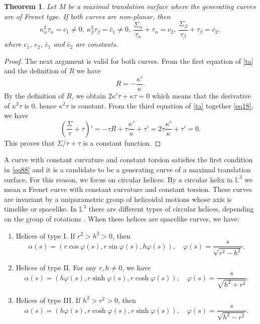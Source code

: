 \documentclass[a4paper,12pt]{amsart}
\numberwithin{equation}{section}
\newtheorem{theorem}{Theorem}[section]
\theoremstyle{definition}
\def\rr{\mathbb L}
\begin{document}
 \begin{theorem}\label{t41}
 Let $M$ be a maximal  translation surface where the generating curves are of Frenet type. If both curves are non-planar, then 
 \begin{equation}\label{eq88}
\kappa_\alpha^2\tau_\alpha=c_1\not=0,\ \kappa_\beta^2\tau_\beta=\bar{c}_1\not=0,\ \frac{\Sigma_\alpha}{\tau_\alpha}+\tau_\alpha=c_2,\ \frac{\Sigma_\beta}{\tau_\beta}+\tau_\beta=\bar{c}_2,
\end{equation}
 where $c_1$, $c_2$, $\bar{c}_1$ and $\bar{c}_2$ are constants.
 \end{theorem}

 \begin{proof}  The next argument is valid for both curves. From the first equation of \eqref{ta} and the definition of $R$ we have 
\begin{equation}\label{eq18}
R=-\frac{\kappa'}{\kappa}.
\end{equation}
 By the definition of $R$, we obtain  $2\kappa'\tau+\kappa\tau=0$ which means that the derivative of $\kappa^2\tau$ is $0$, hence $\kappa^2\tau$ is constant. From the third equation of \eqref{ta} together \eqref{eq18}, we have 
 $$\left(\frac{\Sigma}{\tau}+\tau\right)'=-\tau R+\tau\frac{\kappa'}{\kappa}+\tau'=2\tau\frac{\kappa'}{\kappa}+\tau'=0.$$
 This proves that $\Sigma/\tau+\tau$ is a constant function.
  
\end{proof}

A curve with constant curvature and constant torsion satisfies the first condition in \eqref{eq88} and it is a candidate to be a generating curve of a maximal translation surface. For this reason, we focus on circular helices.   By a circular helix in $\rr^3$ we mean a Frenet curve with constant curvature and constant torsion. These curves are invariant by a uniparametric group of helicoidal motions whose axis is timelike or spacelike. In $\rr^3$ there are different types of circular helices, depending on the group of rotations \cite{lo2}. When these helices are spacelike curves, we have:  
\begin{enumerate}
\item Helices of type I. If $r^2>h^2>0$, then
\begin{equation}\label{h1}
\alpha(s)=(r\cos \varphi(s),r\sin \varphi(s),h \varphi(s)),\quad \varphi(s)=\frac{s}{\sqrt{r^2-h^2}}.
\end{equation}
\item Helices of type II. For any $r,h\not=0$, we have 
\begin{equation}\label{h2}
\alpha(s)=(h\varphi(s),r\sinh \varphi(s),r\cosh \varphi(s)),\quad \varphi(s)=\frac{s}{\sqrt{h^2+r^2}}.
\end{equation}
\item Helices of type III. If $h^2>r^2>0$, then
\begin{equation}\label{h3}
\alpha(s)=(h\varphi(s),r\cosh \varphi(s),r\sinh \varphi(s)),\quad \varphi(s)=\frac{s}{\sqrt{h^2-r^2}}.
\end{equation}
\end{enumerate}
\end{document}
